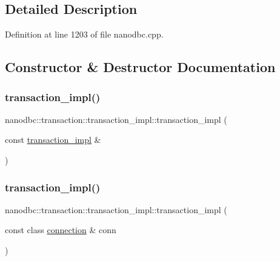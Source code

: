 \subsection{Detailed Description}


Definition at line 1203 of file nanodbc.\+cpp.



\subsection{Constructor \& Destructor Documentation}
\mbox{\label{classnanodbc_1_1transaction_1_1transaction__impl_a398a748613a044bbe7575ae89a1d5c99}} 
\subsubsection{\texorpdfstring{transaction\_impl()}{transaction\_impl()}\hspace{0.1cm}{\footnotesize\ttfamily [1/2]}}
{\footnotesize\ttfamily nanodbc\+::transaction\+::transaction\+\_\+impl\+::transaction\+\_\+impl (\begin{DoxyParamCaption}\item[{const \mbox{\hyperlink{classnanodbc_1_1transaction_1_1transaction__impl}{transaction\+\_\+impl}} \&}]{ }\end{DoxyParamCaption})\hspace{0.3cm}{\ttfamily [delete]}}

\mbox{\label{classnanodbc_1_1transaction_1_1transaction__impl_a73b82d6fefc494ee13152591dbda51ca}} 
\subsubsection{\texorpdfstring{transaction\_impl()}{transaction\_impl()}\hspace{0.1cm}{\footnotesize\ttfamily [2/2]}}
{\footnotesize\ttfamily nanodbc\+::transaction\+::transaction\+\_\+impl\+::transaction\+\_\+impl (\begin{DoxyParamCaption}\item[{const class \mbox{\hyperlink{classnanodbc_1_1connection}{connection}} \&}]{conn }\end{DoxyParamCaption})\hspace{0.3cm}{\ttfamily [inline]}}



